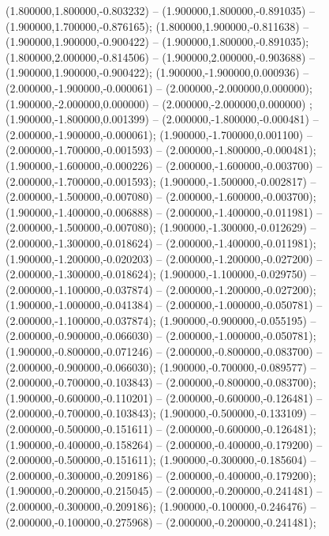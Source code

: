  (1.800000,1.800000,-0.803232) -- (1.900000,1.800000,-0.891035) -- (1.900000,1.700000,-0.876165);
 (1.800000,1.900000,-0.811638) -- (1.900000,1.900000,-0.900422) -- (1.900000,1.800000,-0.891035);
 (1.800000,2.000000,-0.814506) -- (1.900000,2.000000,-0.903688) -- (1.900000,1.900000,-0.900422);
 (1.900000,-1.900000,0.000936) -- (2.000000,-1.900000,-0.000061) -- (2.000000,-2.000000,0.000000);
 (1.900000,-2.000000,0.000000) -- (2.000000,-2.000000,0.000000) ;
 (1.900000,-1.800000,0.001399) -- (2.000000,-1.800000,-0.000481) -- (2.000000,-1.900000,-0.000061);
 (1.900000,-1.700000,0.001100) -- (2.000000,-1.700000,-0.001593) -- (2.000000,-1.800000,-0.000481);
 (1.900000,-1.600000,-0.000226) -- (2.000000,-1.600000,-0.003700) -- (2.000000,-1.700000,-0.001593);
 (1.900000,-1.500000,-0.002817) -- (2.000000,-1.500000,-0.007080) -- (2.000000,-1.600000,-0.003700);
 (1.900000,-1.400000,-0.006888) -- (2.000000,-1.400000,-0.011981) -- (2.000000,-1.500000,-0.007080);
 (1.900000,-1.300000,-0.012629) -- (2.000000,-1.300000,-0.018624) -- (2.000000,-1.400000,-0.011981);
 (1.900000,-1.200000,-0.020203) -- (2.000000,-1.200000,-0.027200) -- (2.000000,-1.300000,-0.018624);
 (1.900000,-1.100000,-0.029750) -- (2.000000,-1.100000,-0.037874) -- (2.000000,-1.200000,-0.027200);
 (1.900000,-1.000000,-0.041384) -- (2.000000,-1.000000,-0.050781) -- (2.000000,-1.100000,-0.037874);
 (1.900000,-0.900000,-0.055195) -- (2.000000,-0.900000,-0.066030) -- (2.000000,-1.000000,-0.050781);
 (1.900000,-0.800000,-0.071246) -- (2.000000,-0.800000,-0.083700) -- (2.000000,-0.900000,-0.066030);
 (1.900000,-0.700000,-0.089577) -- (2.000000,-0.700000,-0.103843) -- (2.000000,-0.800000,-0.083700);
 (1.900000,-0.600000,-0.110201) -- (2.000000,-0.600000,-0.126481) -- (2.000000,-0.700000,-0.103843);
 (1.900000,-0.500000,-0.133109) -- (2.000000,-0.500000,-0.151611) -- (2.000000,-0.600000,-0.126481);
 (1.900000,-0.400000,-0.158264) -- (2.000000,-0.400000,-0.179200) -- (2.000000,-0.500000,-0.151611);
 (1.900000,-0.300000,-0.185604) -- (2.000000,-0.300000,-0.209186) -- (2.000000,-0.400000,-0.179200);
 (1.900000,-0.200000,-0.215045) -- (2.000000,-0.200000,-0.241481) -- (2.000000,-0.300000,-0.209186);
 (1.900000,-0.100000,-0.246476) -- (2.000000,-0.100000,-0.275968) -- (2.000000,-0.200000,-0.241481);
